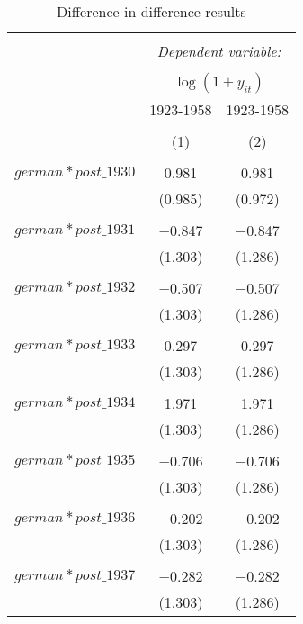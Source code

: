 

\begin{table}[!htbp] \centering 
  \caption{Difference-in-difference results} 
  \label{dif_table} 
\begin{tabular}{@{\extracolsep{5pt}}lcc} 
\\[-1.8ex]\hline 
\hline \\[-1.8ex] 

 & \multicolumn{2}{c}{\textit{Dependent variable:}} \\ 
\cline{2-3} 
\\[-1.8ex] & \multicolumn{2}{c}{$\log(1 + y_{it})$} \\ 
 & 1923-1958 & 1923-1958 \\ 
\\[-1.8ex] & (1) & (2)\\ 
\hline \\[-1.8ex] 
 $german*post\_1930$ & 0.981 & 0.981 \\ 
  & (0.985) & (0.972) \\ 
  & & \\ 
 $german*post\_1931$ & $-$0.847 & $-$0.847 \\ 
  & (1.303) & (1.286) \\ 
  & & \\ 
 $german*post\_1932$ & $-$0.507 & $-$0.507 \\ 
  & (1.303) & (1.286) \\ 
  & & \\ 
 $german*post\_1933$ & 0.297 & 0.297 \\ 
  & (1.303) & (1.286) \\ 
  & & \\ 
 $german*post\_1934$ & 1.971 & 1.971 \\ 
  & (1.303) & (1.286) \\ 
  & & \\ 
 $german*post\_1935$ & $-$0.706 & $-$0.706 \\ 
  & (1.303) & (1.286) \\ 
  & & \\ 
 $german*post\_1936$ & $-$0.202 & $-$0.202 \\ 
  & (1.303) & (1.286) \\ 
  & & \\ 
 $german*post\_1937$ & $-$0.282 & $-$0.282 \\ 
  & (1.303) & (1.286) \\ 

\end{tabular}
\end{table}

